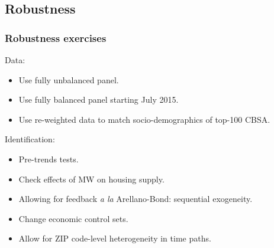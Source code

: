 \subsection{Robustness}
\begin{frame}
	\frametitle{Robustness exercises}

	Data:
	\begin{itemize} \small
		\item Use fully unbalanced panel.
	
	    \vspace{.5mm} \item Use fully balanced panel starting July 2015.
	    
	    \vspace{.5mm} \item Use re-weighted data to match socio-demographics of top-100 
	    CBSA.
	\end{itemize}
	
	\pause
	\vspace{2.5mm}
	Identification:
	\begin{itemize} \small
	   	\item Pre-trends tests.
		
		\vspace{.5mm} \item Check effects of MW on housing supply.
		
		\vspace{.5mm} \item Allowing for feedback \textit{a la} Arellano-Bond: sequential 
		exogeneity.
		
		\vspace{.5mm} \item Change economic control sets.
		
		\vspace{.5mm} \item Allow for ZIP code-level heterogeneity in time paths.
	\end{itemize}

\end{frame}

